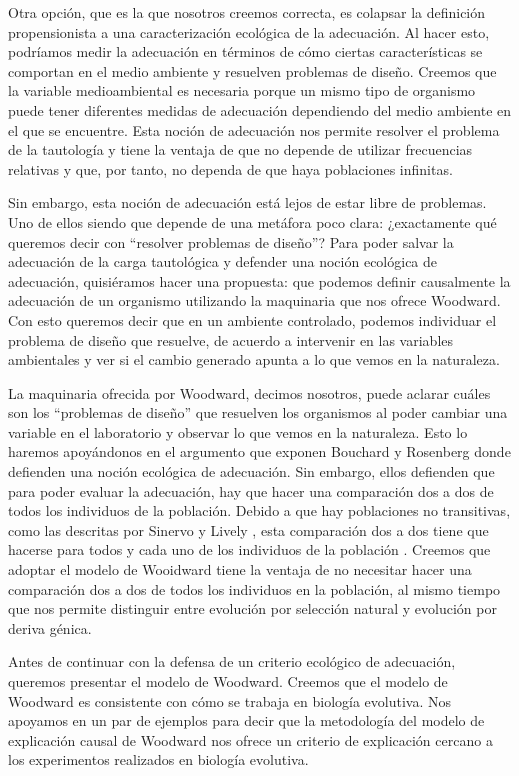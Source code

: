 Otra opción, que es la que nosotros creemos correcta, es colapsar la definición propensionista a una caracterización ecológica de la adecuación. Al hacer esto, podríamos medir la adecuación en términos de cómo ciertas características se comportan en el medio ambiente y resuelven problemas de diseño\cite{sep-fitness, Bouchard2004}. Creemos que la variable medioambiental es necesaria porque un mismo tipo de organismo puede tener diferentes medidas de adecuación dependiendo del medio ambiente en el que se encuentre.  Esta noción de adecuación nos permite resolver el problema de la tautología y tiene la ventaja de que no depende de utilizar frecuencias relativas y que, por tanto, no dependa de que haya poblaciones infinitas.

Sin embargo, esta noción de adecuación está lejos de estar libre de problemas. Uno de ellos siendo que depende de una metáfora poco clara: ¿exactamente qué queremos decir con ``resolver problemas de diseño''? Para poder salvar la adecuación de la carga tautológica y defender una noción ecológica de adecuación, quisiéramos hacer una propuesta: que podemos definir causalmente la adecuación de un organismo utilizando la maquinaria que nos ofrece Woodward. Con esto queremos decir que en un ambiente controlado, podemos individuar el problema de diseño que resuelve, de acuerdo a intervenir en las variables ambientales y ver si el cambio generado apunta a lo que vemos en la naturaleza.

La maquinaria ofrecida por Woodward, decimos nosotros, puede aclarar cuáles son los ``problemas de diseño'' que resuelven los organismos al poder cambiar una variable en el laboratorio y observar lo que vemos en la naturaleza. Esto lo haremos apoyándonos en el argumento que exponen Bouchard y Rosenberg \citeyear{Bouchard2004} donde defienden una noción ecológica de adecuación. Sin embargo, ellos defienden que para poder evaluar la adecuación, hay que hacer una comparación dos a dos de todos los individuos de la población. Debido a que hay poblaciones no transitivas, como las descritas por Sinervo y Lively \cite{Sinervo1996}, esta comparación dos a dos tiene que hacerse para todos y cada uno de los individuos de la población \cite{Millstein2006}. Creemos que adoptar el modelo de Wooidward tiene la ventaja de no necesitar hacer una comparación dos a dos de todos los individuos en la población, al mismo tiempo que nos permite distinguir entre evolución por selección natural y evolución por deriva génica.

Antes de continuar con la defensa de un criterio ecológico de adecuación, queremos presentar el modelo de Woodward. Creemos que el modelo de Woodward es consistente con cómo se trabaja en biología evolutiva. Nos apoyamos en un par de ejemplos para decir que la metodología del modelo de explicación causal de Woodward  nos ofrece un criterio de explicación cercano a los experimentos realizados en biología evolutiva.


